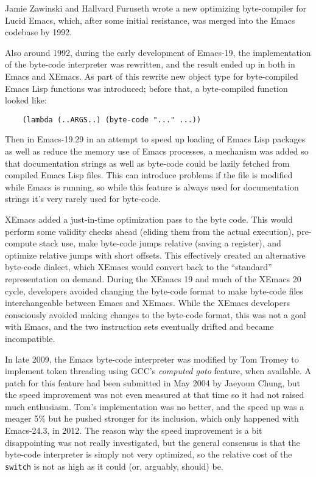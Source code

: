 \documentclass[format=acmsmall, review]{acmart}
\newcommand \Elisp {Emacs Lisp}
\begin{document}
Jamie Zawinski and Hallvard Furuseth wrote a new optimizing
byte-compiler for Lucid Emacs, which, after some initial resistance, was
merged into the Emacs codebase by 1992.

Also around 1992, during the early development of Emacs-19, the
implementation of the byte-code interpreter was rewritten, and the
result ended up in both in Emacs and XEmacs.
As part of this rewrite new object type for byte-compiled \Elisp{}
functions was introduced; before that, a byte-compiled function looked
like:
\begin{verbatim}
    (lambda (..ARGS..) (byte-code "..." ...))
\end{verbatim}
Then in Emacs-19.29 in an attempt to speed up loading of \Elisp{} packages
as well as reduce the memory use of Emacs processes, a mechanism was added
so that documentation strings as well as byte-code could be lazily fetched
from compiled \Elisp{} files.  This can introduce problems if the file is
modified while Emacs is running, so while this feature is always used
for documentation strings it's very rarely used for byte-code.


XEmacs added a just-in-time optimization pass to the byte code.  This
would perform some validity checks ahead (eliding them from the actual
execution), pre-compute stack use, make byte-code jumps relative
(saving a register), and optimize relative jumps with short offsets.
This effectively created an alternative byte-code dialect, which
XEmacs would convert back to the ``standard'' representation on
demand.
During the XEmacs 19 and much of the XEmacs 20 cycle, developers
avoided changing the byte-code format to make byte-code files
interchangeable between Emacs and XEmacs.  While
the XEmacs developers consciously avoided making changes to the
byte-code format, this was not a goal with Emacs, and the two
instruction sets eventually drifted and became incompatible.

In late 2009, the Emacs byte-code interpreter was modified by Tom Tromey to
implement token threading using GCC's \emph{computed goto} feature, when
available.  A patch for this feature had been submitted in May 2004 by
Jaeyoun Chung, but the speed improvement was not even measured at that time
so it had not raised much enthusiasm.  Tom's implementation was no better,
and the speed up was a meager 5\% but he pushed stronger for its inclusion,
which only happened with Emacs-24.3, in 2012.  The reason why the speed
improvement is a bit disappointing was not really investigated, but the
general consensus is that the byte-code interpreter is simply not very
optimized, so the relative cost of the \texttt{switch} is not as high as it
could (or, arguably, should) be.
\end{document}
